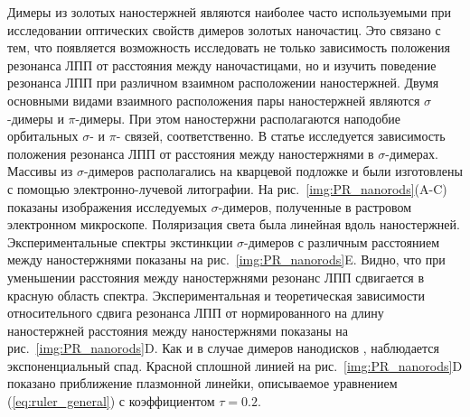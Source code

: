 Димеры из золотых наностержней являются наиболее часто используемыми при исследовании оптических свойств димеров золотых наночастиц. Это связано с тем, что появляется возможность исследовать не только зависимость положения резонанса ЛПП от расстояния между наночастицами, но и изучить поведение резонанса ЛПП при различном взаимном расположении наностержней. Двумя основными видами взаимного расположения пары наностержней являются $ \sigma $-димеры и $ \pi $-димеры. При этом наностержни располагаются наподобие орбитальных $ \sigma $- и $ \pi $- связей, соответственно. В статье \cite{nanorods2} исследуется зависимость положения резонанса ЛПП от расстояния между наностержнями в $ \sigma $-димерах. Массивы из $ \sigma $-димеров располагались на кварцевой подложке и были изготовлены с помощью электронно-лучевой литографии. На рис.~\ref{img:PR_nanorods}(A-C) показаны изображения исследуемых $ \sigma $-димеров, полученные в растровом электронном микроскопе. Поляризация света была линейная вдоль наностержней. Экспериментальные спектры экстинкции $ \sigma $-димеров с различным расстоянием между наностержнями показаны на рис.~\ref{img:PR_nanorods}E. Видно, что при уменьшении расстояния между наностержнями резонанс ЛПП сдвигается в красную область спектра. Экспериментальная и теоретическая зависимости относительного сдвига резонанса ЛПП от нормированного на длину наностержней расстояния между наностержнями показаны на рис.~\ref{img:PR_nanorods}D. Как и в случае димеров нанодисков \cite{plasonrulereq}, наблюдается экспоненциальный спад. Красной сплошной линией на рис.~\ref{img:PR_nanorods}D показано приближение плазмонной линейки, описываемое уравнением (\ref{eq:ruler_general})  с коэффициентом $ \tau = 0.2 $.

